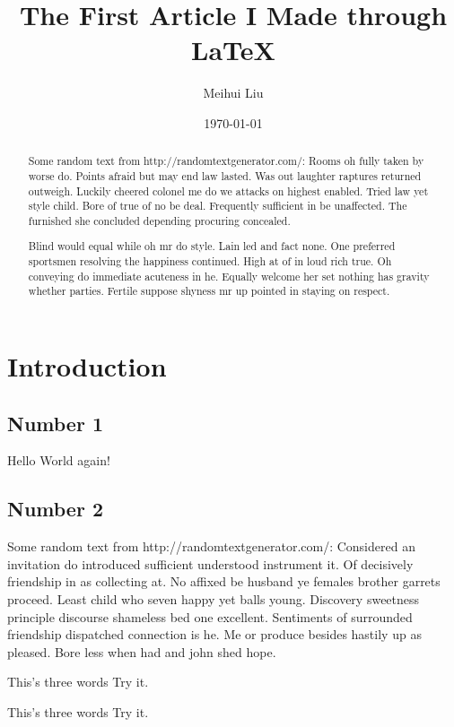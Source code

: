 \documentclass[letterpaper, notitlepage, 12pt]{article} %
\begin{document}
\title{The First Article I Made through LaTeX}%
\author{Meihui Liu}%
\date{\today}%
\maketitle

\begin{abstract}
Some random text from http://randomtextgenerator.com/:
Rooms oh fully taken by worse do. Points afraid but may end law lasted. Was out laughter raptures returned outweigh. Luckily cheered colonel me do we attacks on highest enabled. Tried law yet style child. Bore of true of no be deal. Frequently sufficient in be unaffected. The furnished she concluded depending procuring concealed. 

Blind would equal while oh mr do style. Lain led and fact none. One preferred sportsmen resolving the happiness continued. High at of in loud rich true. Oh conveying do immediate acuteness in he. Equally welcome her set nothing has gravity whether parties. Fertile suppose shyness mr up pointed in staying on respect. 
\end{abstract}

\section{Introduction}

\subsection{Number 1}
Hello {\color{red} World} again!

\subsection{Number 2}
Some random text from http://randomtextgenerator.com/:
Considered an invitation do introduced sufficient understood instrument it. Of decisively friendship in as collecting at. No affixed be husband ye females brother garrets proceed. Least child who seven happy yet balls young. Discovery sweetness principle discourse shameless bed one excellent. Sentiments of surrounded friendship dispatched connection is he. Me or produce besides hastily up as pleased. Bore less when had and john shed hope. 

\newpage
This's three words \break Try it.

This's three words \hfil\break Try it.
\end{document}
